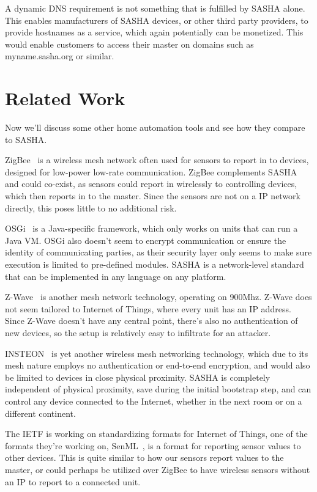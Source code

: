 A dynamic DNS requirement is not something that is fulfilled by SASHA alone. This enables manufacturers of SASHA devices, or other third party providers, to provide hostnames as a service, which again potentially can be monetized. This would enable customers to access their master on domains such as myname.sasha.org or similar.

\section{Related Work}

Now we'll discuss some other home automation tools and see how they compare to SASHA.

ZigBee~\cite{zigbee} is a wireless mesh network often used for sensors to report in to devices, designed for low-power low-rate communication. ZigBee complements SASHA and could co-exist, as sensors could report in wirelessly to controlling devices, which then reports in to the master. Since the sensors are not on a IP network directly, this poses little to no additional risk.

OSGi~\cite{osgi} is a Java-specific framework, which only works on units that can run a Java VM. OSGi also doesn't seem to encrypt communication or ensure the identity of communicating parties, as their security layer only seems to make sure execution is limited to pre-defined modules. SASHA is a network-level standard that can be implemented in any language on any platform.

Z-Wave~\cite[Annex~A]{z-wave} is another mesh network technology, operating on 900Mhz. Z-Wave does not seem tailored to Internet of Things, where every unit has an IP address. Since Z-Wave doesn't have any central point, there's also no authentication of new devices, so the setup is relatively easy to infiltrate for an attacker.

INSTEON~\cite{insteon} is yet another wireless mesh networking technology, which due to its mesh nature employs no authentication or end-to-end encryption, and would also be limited to devices in close physical proximity. SASHA is completely independent of physical proximity, save during the initial bootstrap step, and can control any device connected to the Internet, whether in the next room or on a different continent.

The IETF is working on standardizing formats for Internet of Things, one of the formats they're working on, SenML~\cite{senml}, is a format for reporting sensor values to other devices. This is quite similar to how our sensors report values to the master, or could perhaps be utilized over ZigBee to have wireless sensors without an IP to report to a connected unit.

